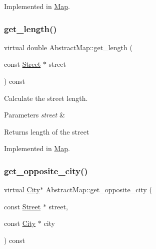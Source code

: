 Implemented in \hyperlink{class_map_acb7d6869cfe4e6e91d3a1c5155ad89b2}{Map}.

\mbox{\label{class_abstract_map_a19a4ead06c11b297f7ec9731574fa326}} 
\subsubsection{\texorpdfstring{get\+\_\+length()}{get\_length()}}
{\footnotesize\ttfamily virtual double Abstract\+Map\+::get\+\_\+length (\begin{DoxyParamCaption}\item[{const \hyperlink{class_street}{Street} $\ast$}]{street }\end{DoxyParamCaption}) const\hspace{0.3cm}{\ttfamily [pure virtual]}}



Calculate the street length. 


\begin{DoxyParams}{Parameters}
{\em street} & \\
\hline
\end{DoxyParams}
\begin{DoxyReturn}{Returns}
length of the street 
\end{DoxyReturn}


Implemented in \hyperlink{class_map_a041fd9e53a2e80a0fb3b1e11e3fdf1e9}{Map}.

\mbox{\label{class_abstract_map_ab372998d6ab42b67d1fd7b97b2c380f2}} 
\subsubsection{\texorpdfstring{get\+\_\+opposite\+\_\+city()}{get\_opposite\_city()}}
{\footnotesize\ttfamily virtual \hyperlink{class_city}{City}$\ast$ Abstract\+Map\+::get\+\_\+opposite\+\_\+city (\begin{DoxyParamCaption}\item[{const \hyperlink{class_street}{Street} $\ast$}]{street,  }\item[{const \hyperlink{class_city}{City} $\ast$}]{city }\end{DoxyParamCaption}) const\hspace{0.3cm}{\ttfamily [pure virtual]}}



